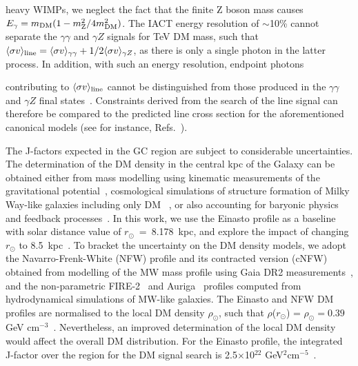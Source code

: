 \documentclass[aps,prl,twocolumn,floats,balancelastpage,showpacs,showkeys,preprintnumbers,floatfix,nofootinbib,superscriptaddress, longbibliography]{revtex4-1}
\begin{document}
heavy WIMPs, we neglect the fact that the finite Z boson mass causes $E_\gamma = m_{\rm DM}(1-m^2_{\rm Z}/4m^2_{\rm DM})$. The  IACT energy resolution of $\sim$10\% cannot separate the $\gamma\gamma$ and $\gamma Z$ signals for TeV DM mass, such that  $\langle\sigma v \rangle_{\rm line} = \langle\sigma v \rangle_{\gamma\gamma} + 1/2 \langle\sigma v \rangle_{\gamma Z}$, as there is only a single photon in the latter process. In addition, with such an energy resolution, endpoint photons

contributing to $\langle\sigma v \rangle_{\rm line}$ cannot be distinguished from those produced in the
$\gamma\gamma$ and $\gamma Z$ final states~\cite{Beneke:2022eci,Baumgart:2023pwn}. Constraints derived from the search of the line signal can therefore be compared to the predicted line cross section for the aforementioned canonical models (see for instance, Refs.~\cite{Baumgart:2017nsr,Rinchiuso:2020skh,Beneke:2022eci,Montanari:2022buj}).


The J-factors expected in the GC region are subject to considerable uncertainties. The determination of the DM density in the central kpc of the Galaxy can be obtained either from mass modelling using kinematic measurements of the gravitational potential~\cite{Portail:2016vei,Cautun:2019eaf}, cosmological simulations of structure formation of Milky Way-like galaxies including only DM ~\cite{Navarro:1996gj,Springel:2008by}, or also accounting for baryonic physics and feedback processes~\cite{Hopkins:2017ycn,Board:2021bwj,McKeown:2021sob}. In this work, we use the Einasto profile as a baseline~\cite{Springel:2008by} with solar distance value of $r_{\odot}$~=~8.178~kpc, and explore the impact of changing $r_{\odot}$ to 8.5~kpc~\cite{Ghez:2008ms}. To bracket the uncertainty on the DM density models, we adopt the Navarro-Frenk-White (NFW) profile and its contracted version (cNFW) obtained from modelling of the MW mass profile using Gaia DR2 measurements~\cite{Cautun:2019eaf,Montanari:2022buj,supplement}, and the non-parametric FIRE-2~\cite{McKeown:2021sob} and Auriga~\cite{Hussein:2025xwm} profiles computed from hydrodynamical simulations of MW-like galaxies. The Einasto and NFW DM profiles are normalised to the local DM density $\rho_\odot$, such that $\rho$($r_\odot$) = $\rho_\odot = 0.39$ GeV cm$^{-3}$~\cite{Catena:2009mf}. Nevertheless, an improved determination of the local DM density would affect the overall DM distribution. For the Einasto profile, the integrated J-factor over the region for the DM signal search is 2.5$\times$10$^{22}$ GeV$^2$cm$^{-5}$~\cite{supplement}.
\end{document}
